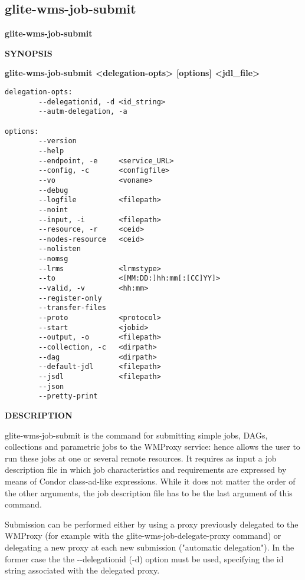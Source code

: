 
\subsection{glite-wms-job-submit}
\label{glite-wms-job-submit}

\medskip
\textbf{glite-wms-job-submit}
\smallskip


\textbf{SYNOPSIS}
\smallskip

\textbf{glite-wms-job-submit <delegation-opts> [options] <jdl\_file>}

\begin{verbatim}
delegation-opts:
        --delegationid, -d <id_string>
        --autm-delegation, -a

options:
        --version
        --help
        --endpoint, -e     <service_URL>
        --config, -c       <configfile>
        --vo               <voname>
        --debug
        --logfile          <filepath>
        --noint
        --input, -i        <filepath>
        --resource, -r     <ceid>
        --nodes-resource   <ceid>
        --nolisten
        --nomsg
        --lrms             <lrmstype>
        --to               <[MM:DD:]hh:mm[:[CC]YY]>
        --valid, -v        <hh:mm>
        --register-only
        --transfer-files
        --proto            <protocol>
        --start            <jobid>
        --output, -o       <filepath>
        --collection, -c   <dirpath>
        --dag              <dirpath>
        --default-jdl      <filepath>
        --jsdl             <filepath>
        --json
        --pretty-print
\end{verbatim}

\medskip
\textbf{DESCRIPTION}
\smallskip

glite-wms-job-submit is the command for submitting simple jobs, DAGs, collections and parametric jobs to the WMProxy service: hence allows the user to run these jobs at one or several remote resources. It requires as input a job description file in which job characteristics and requirements are expressed by means of Condor class-ad-like expressions. 
While it does not matter the order of the other arguments, the job description file has to be the last argument of this command.

Submission can be performed either by using a proxy previously delegated to the WMProxy (for example with the glite-wms-job-delegate-proxy command) or delegating a new proxy at each new submission ("automatic delegation"). In the former case the the -{}-delegationid (-d) option must be used, specifying the id string associated with the delegated proxy.


